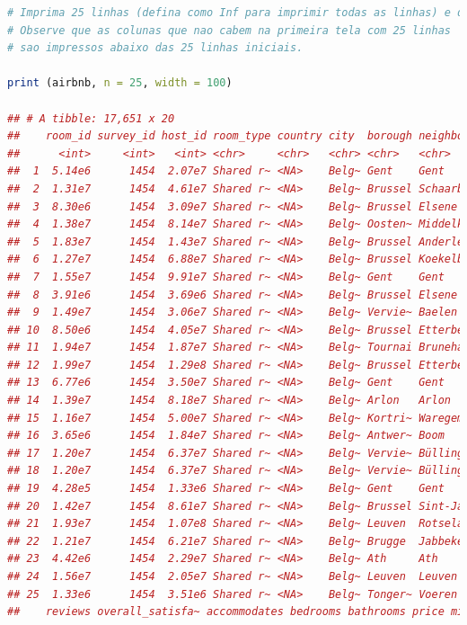 \documentclass{article}
\begin{document}
\begin{lstlisting}[language=R]
# Imprima 25 linhas (defina como Inf para imprimir todas as linhas) e defina a largura como 100 para ver mais colunas.
# Observe que as colunas que nao cabem na primeira tela com 25 linhas
# sao impressos abaixo das 25 linhas iniciais.

print (airbnb, n = 25, width = 100)

## # A tibble: 17,651 x 20
##    room_id survey_id host_id room_type country city  borough neighborhood
##      <int>     <int>   <int> <chr>     <chr>   <chr> <chr>   <chr>       
##  1  5.14e6      1454  2.07e7 Shared r~ <NA>    Belg~ Gent    Gent        
##  2  1.31e7      1454  4.61e7 Shared r~ <NA>    Belg~ Brussel Schaarbeek  
##  3  8.30e6      1454  3.09e7 Shared r~ <NA>    Belg~ Brussel Elsene      
##  4  1.38e7      1454  8.14e7 Shared r~ <NA>    Belg~ Oosten~ Middelkerke 
##  5  1.83e7      1454  1.43e7 Shared r~ <NA>    Belg~ Brussel Anderlecht  
##  6  1.27e7      1454  6.88e7 Shared r~ <NA>    Belg~ Brussel Koekelberg  
##  7  1.55e7      1454  9.91e7 Shared r~ <NA>    Belg~ Gent    Gent        
##  8  3.91e6      1454  3.69e6 Shared r~ <NA>    Belg~ Brussel Elsene      
##  9  1.49e7      1454  3.06e7 Shared r~ <NA>    Belg~ Vervie~ Baelen      
## 10  8.50e6      1454  4.05e7 Shared r~ <NA>    Belg~ Brussel Etterbeek   
## 11  1.94e7      1454  1.87e7 Shared r~ <NA>    Belg~ Tournai Brunehaut   
## 12  1.99e7      1454  1.29e8 Shared r~ <NA>    Belg~ Brussel Etterbeek   
## 13  6.77e6      1454  3.50e7 Shared r~ <NA>    Belg~ Gent    Gent        
## 14  1.39e7      1454  8.18e7 Shared r~ <NA>    Belg~ Arlon   Arlon       
## 15  1.16e7      1454  5.00e7 Shared r~ <NA>    Belg~ Kortri~ Waregem     
## 16  3.65e6      1454  1.84e7 Shared r~ <NA>    Belg~ Antwer~ Boom        
## 17  1.20e7      1454  6.37e7 Shared r~ <NA>    Belg~ Vervie~ Büllingen   
## 18  1.20e7      1454  6.37e7 Shared r~ <NA>    Belg~ Vervie~ Büllingen   
## 19  4.28e5      1454  1.33e6 Shared r~ <NA>    Belg~ Gent    Gent        
## 20  1.42e7      1454  8.61e7 Shared r~ <NA>    Belg~ Brussel Sint-Jans-M~
## 21  1.93e7      1454  1.07e8 Shared r~ <NA>    Belg~ Leuven  Rotselaar   
## 22  1.21e7      1454  6.21e7 Shared r~ <NA>    Belg~ Brugge  Jabbeke     
## 23  4.42e6      1454  2.29e7 Shared r~ <NA>    Belg~ Ath     Ath         
## 24  1.56e7      1454  2.05e7 Shared r~ <NA>    Belg~ Leuven  Leuven      
## 25  1.33e6      1454  3.51e6 Shared r~ <NA>    Belg~ Tonger~ Voeren      
##    reviews overall_satisfa~ accommodates bedrooms bathrooms price minstay

\end{lstlisting}
\end{document}

